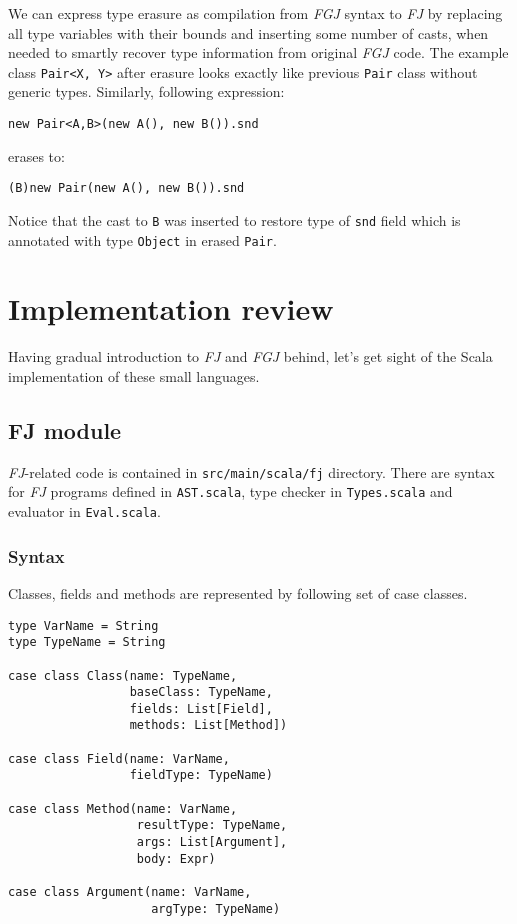 \documentclass{article}[12pt]
\begin{document}
We can express type erasure as compilation from \emph{FGJ} syntax
to \emph{FJ} by replacing all type variables with their bounds
and inserting some number of casts, when needed to smartly recover
type information from original \emph{FGJ} code. The example class
\texttt{Pair<X, Y>} after erasure looks exactly like previous
\texttt{Pair} class without generic types. Similarly, following
expression:
\begin{verbatim}
new Pair<A,B>(new A(), new B()).snd
\end{verbatim}
erases to:
\begin{verbatim}
(B)new Pair(new A(), new B()).snd
\end{verbatim}
Notice that the cast to \texttt{B} was inserted to restore type
of \texttt{snd} field which is annotated with type \texttt{Object}
in erased \texttt{Pair}.

\section{Implementation review}

Having gradual introduction to \emph{FJ} and \emph{FGJ} behind,
let's get sight of the Scala implementation of these small languages.

\subsection{FJ module}

\emph{FJ}-related code is contained in \texttt{src/main/scala/fj}
directory. There are syntax for \emph{FJ} programs defined in
\texttt{AST.scala}, type checker in \texttt{Types.scala} and
evaluator in \texttt{Eval.scala}.

\subsubsection{Syntax}

Classes, fields and methods are represented by following set of
case classes.

\begin{verbatim}
type VarName = String
type TypeName = String

case class Class(name: TypeName,
                 baseClass: TypeName,
                 fields: List[Field],
                 methods: List[Method])

case class Field(name: VarName,
                 fieldType: TypeName)

case class Method(name: VarName,
                  resultType: TypeName,
                  args: List[Argument],
                  body: Expr)

case class Argument(name: VarName,
                    argType: TypeName)
\end{verbatim}
\end{document}
